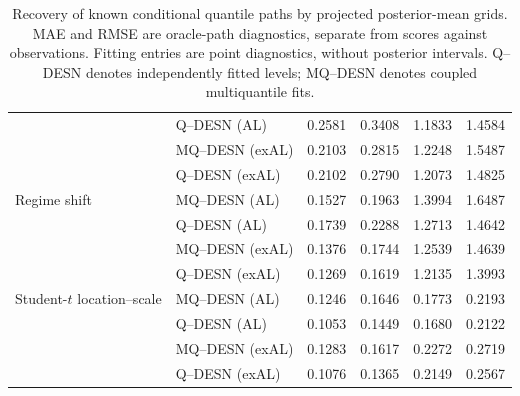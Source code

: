 \begin{table}[p]
\begin{tabular}{@{}>{\raggedright\arraybackslash}p{}>{\raggedright\arraybackslash}p{}rrrr@{}}
 & Q--DESN (AL) & 0.2581 & 0.3408 & 1.1833 & 1.4584 \\
 & MQ--DESN (exAL) & 0.2103 & 0.2815 & 1.2248 & 1.5487 \\
 & Q--DESN (exAL) & 0.2102 & 0.2790 & 1.2073 & 1.4825 \\
\addlinespace[2pt]
Regime shift & MQ--DESN (AL) & 0.1527 & 0.1963 & 1.3994 & 1.6487 \\
 & Q--DESN (AL) & 0.1739 & 0.2288 & 1.2713 & 1.4642 \\
 & MQ--DESN (exAL) & 0.1376 & 0.1744 & 1.2539 & 1.4639 \\
 & Q--DESN (exAL) & 0.1269 & 0.1619 & 1.2135 & 1.3993 \\
\addlinespace[2pt]
Student-\(t\) location--scale & MQ--DESN (AL) & 0.1246 & 0.1646 & 0.1773 & 0.2193 \\
 & Q--DESN (AL) & 0.1053 & 0.1449 & 0.1680 & 0.2122 \\
 & MQ--DESN (exAL) & 0.1283 & 0.1617 & 0.2272 & 0.2719 \\
 & Q--DESN (exAL) & 0.1076 & 0.1365 & 0.2149 & 0.2567 \\
\bottomrule
\end{tabular}
\caption{Recovery of known conditional quantile paths by projected posterior-mean grids. MAE and RMSE are oracle-path diagnostics, separate from scores against observations. Fitting entries are point diagnostics, without posterior intervals. Q--DESN denotes independently fitted levels; MQ--DESN denotes coupled multiquantile fits.}
\label{tab:joint-qdesn-pure-desn-v2-oracle}
\end{table}
